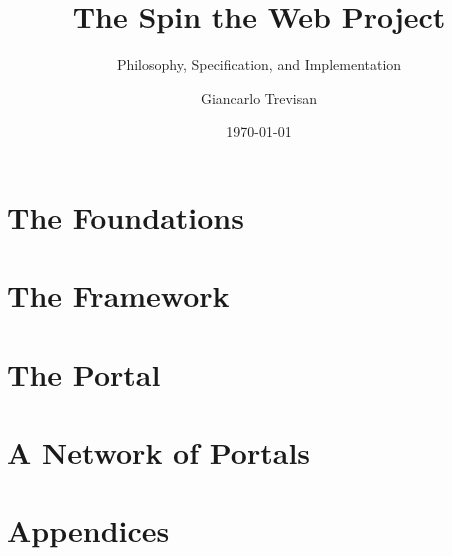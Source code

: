 \documentclass[11pt,openright,twoside,a4paper]{book}
\title{The Spin the Web Project}
\subtitle{Philosophy, Specification, and Implementation}
\author{Giancarlo Trevisan}
\date{\today}
\begin{document}
\frontmatter






\setcounter{tocdepth}{0}
\tableofcontents

\mainmatter

\part{The Foundations}






\part{The Framework}









\part{The Portal}





\part{A Network of Portals}



\part*{Appendices}
\appendix






\backmatter
\begingroup
	\nocite{*}
	
	
\endgroup
\glsaddall
\printglossary
\printindex
\end{document}
